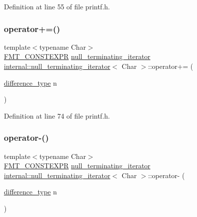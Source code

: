 Definition at line 55 of file printf.\+h.

\mbox{\label{classinternal_1_1null__terminating__iterator_af5935f88d2004280c87744eea3aa6f00}} 
\subsubsection{\texorpdfstring{operator+=()}{operator+=()}}
{\footnotesize\ttfamily template$<$typename Char$>$ \\
\hyperlink{core_8h_a69201cb276383873487bf68b4ef8b4cd}{F\+M\+T\+\_\+\+C\+O\+N\+S\+T\+E\+X\+PR} \hyperlink{classinternal_1_1null__terminating__iterator}{null\+\_\+terminating\+\_\+iterator} \hyperlink{classinternal_1_1null__terminating__iterator}{internal\+::null\+\_\+terminating\+\_\+iterator}$<$ Char $>$\+::operator+= (\begin{DoxyParamCaption}\item[{\hyperlink{classinternal_1_1null__terminating__iterator_ad1a2aa728f679bdfdbdc644f1c43e819}{difference\+\_\+type}}]{n }\end{DoxyParamCaption})\hspace{0.3cm}{\ttfamily [inline]}}



Definition at line 74 of file printf.\+h.

\mbox{\label{classinternal_1_1null__terminating__iterator_a73f50b864c88a4dabeab45e4fbc38e32}} 
\subsubsection{\texorpdfstring{operator-\/()}{operator-()}\hspace{0.1cm}{\footnotesize\ttfamily [1/2]}}
{\footnotesize\ttfamily template$<$typename Char$>$ \\
\hyperlink{core_8h_a69201cb276383873487bf68b4ef8b4cd}{F\+M\+T\+\_\+\+C\+O\+N\+S\+T\+E\+X\+PR} \hyperlink{classinternal_1_1null__terminating__iterator}{null\+\_\+terminating\+\_\+iterator} \hyperlink{classinternal_1_1null__terminating__iterator}{internal\+::null\+\_\+terminating\+\_\+iterator}$<$ Char $>$\+::operator-\/ (\begin{DoxyParamCaption}\item[{\hyperlink{classinternal_1_1null__terminating__iterator_ad1a2aa728f679bdfdbdc644f1c43e819}{difference\+\_\+type}}]{n }\end{DoxyParamCaption})\hspace{0.3cm}{\ttfamily [inline]}}



